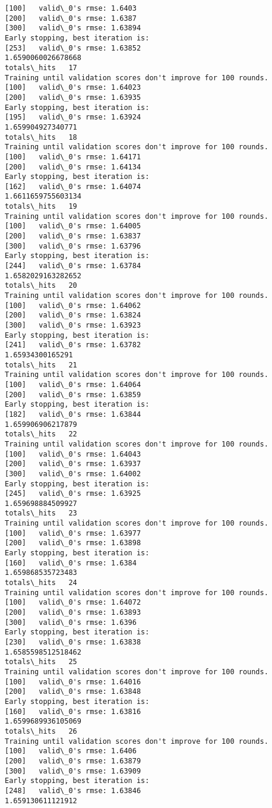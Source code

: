 \documentclass[11pt]{article}
\begin{document}
\begin{Verbatim}[commandchars=\\\{\}]
[100]	valid\_0's rmse: 1.6403
[200]	valid\_0's rmse: 1.6387
[300]	valid\_0's rmse: 1.63894
Early stopping, best iteration is:
[253]	valid\_0's rmse: 1.63852
1.6590060026678668
totals\_hits   17
Training until validation scores don't improve for 100 rounds.
[100]	valid\_0's rmse: 1.64023
[200]	valid\_0's rmse: 1.63935
Early stopping, best iteration is:
[195]	valid\_0's rmse: 1.63924
1.659904927340771
totals\_hits   18
Training until validation scores don't improve for 100 rounds.
[100]	valid\_0's rmse: 1.64171
[200]	valid\_0's rmse: 1.64134
Early stopping, best iteration is:
[162]	valid\_0's rmse: 1.64074
1.6611659755603134
totals\_hits   19
Training until validation scores don't improve for 100 rounds.
[100]	valid\_0's rmse: 1.64005
[200]	valid\_0's rmse: 1.63837
[300]	valid\_0's rmse: 1.63796
Early stopping, best iteration is:
[244]	valid\_0's rmse: 1.63784
1.6582029163282652
totals\_hits   20
Training until validation scores don't improve for 100 rounds.
[100]	valid\_0's rmse: 1.64062
[200]	valid\_0's rmse: 1.63824
[300]	valid\_0's rmse: 1.63923
Early stopping, best iteration is:
[241]	valid\_0's rmse: 1.63782
1.65934300165291
totals\_hits   21
Training until validation scores don't improve for 100 rounds.
[100]	valid\_0's rmse: 1.64064
[200]	valid\_0's rmse: 1.63859
Early stopping, best iteration is:
[182]	valid\_0's rmse: 1.63844
1.659906906217879
totals\_hits   22
Training until validation scores don't improve for 100 rounds.
[100]	valid\_0's rmse: 1.64043
[200]	valid\_0's rmse: 1.63937
[300]	valid\_0's rmse: 1.64002
Early stopping, best iteration is:
[245]	valid\_0's rmse: 1.63925
1.659698884509927
totals\_hits   23
Training until validation scores don't improve for 100 rounds.
[100]	valid\_0's rmse: 1.63977
[200]	valid\_0's rmse: 1.63898
Early stopping, best iteration is:
[160]	valid\_0's rmse: 1.6384
1.659868535723483
totals\_hits   24
Training until validation scores don't improve for 100 rounds.
[100]	valid\_0's rmse: 1.64072
[200]	valid\_0's rmse: 1.63893
[300]	valid\_0's rmse: 1.6396
Early stopping, best iteration is:
[230]	valid\_0's rmse: 1.63838
1.6585598512518462
totals\_hits   25
Training until validation scores don't improve for 100 rounds.
[100]	valid\_0's rmse: 1.64016
[200]	valid\_0's rmse: 1.63848
Early stopping, best iteration is:
[160]	valid\_0's rmse: 1.63816
1.6599689936105069
totals\_hits   26
Training until validation scores don't improve for 100 rounds.
[100]	valid\_0's rmse: 1.6406
[200]	valid\_0's rmse: 1.63879
[300]	valid\_0's rmse: 1.63909
Early stopping, best iteration is:
[248]	valid\_0's rmse: 1.63846
1.659130611121912

\end{Verbatim}
\end{document}
